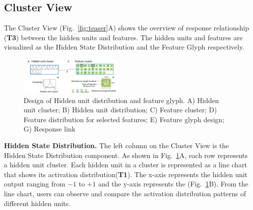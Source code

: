 \subsection{Cluster View}

The Cluster View (Fig.~\ref{fig:teaser}A) shows the overview of response relationship (\textbf{T3}) between the hidden units and features. The hidden units and features are visualized as the Hidden State Distribution and the Feature Glyph respectively.


\begin{figure}[t]
	\centering
    \includegraphics[width=0.45\textwidth]{pictures/design/cluster_design.pdf}
	\vspace{-3mm}
	\caption{Design of Hidden unit distribution and feature glyph. A) Hidden unit cluster; B) Hidden unit distribution; C) Feature cluster; D) Feature distribution for selected features; E) Feature glyph design; G) Response link}
	\label{fig:cluster_design}
	\vspace{-4mm}
\end{figure}


\textbf{Hidden State Distribution.}
The left column on the Cluster View is the Hidden State Distribution component.
As shown in Fig.~\ref{fig:cluster_design}A, each row represents a hidden unit cluster.
Each hidden unit in a cluster is represented as a line chart that shows its activation distribution(\textbf{T1}).
The x-axis represents the hidden unit output ranging from $-1$ to $+1$ and the y-axis represents the  (Fig.~\ref{fig:cluster_design}B).
From the line chart, users can observe and compare the activation distribution patterns of different hidden units. 

